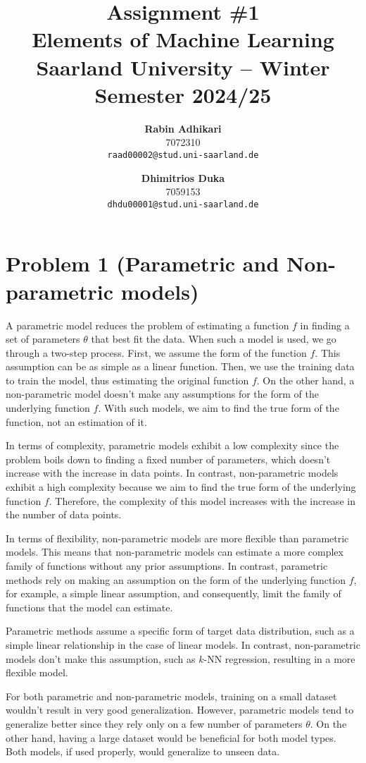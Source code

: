 \documentclass{article}
\title{Assignment \#1\\
  \vspace{2mm}
  \small{Elements of Machine Learning}
  \\
  \vspace{2mm}
  \small{Saarland University -- Winter Semester 2024/25}
}
\author{%
\textbf{Rabin Adhikari} \\
  7072310 \\
  \texttt{raad00002@stud.uni-saarland.de} \\
  \and
  \textbf{Dhimitrios Duka} \\
 7059153 \\
  \texttt{dhdu00001@stud.uni-saarland.de} \\
}
\begin{document}
\maketitle

\section*{Problem 1 (Parametric and Non-parametric models)}
A parametric model reduces the problem of estimating a function $f$ in finding a set of parameters $\theta$ that best fit the data. When such a model is used, we go through a two-step process. First, we assume the form of the function $f$. This assumption can be as simple as a linear function. Then, we use the training data to train the model, thus estimating the original function $f$. On the other hand, a non-parametric model doesn't make any assumptions for the form of the underlying function $f$. With such models, we aim to find the true form of the function, not an estimation of it. 

In terms of complexity, parametric models exhibit a low complexity since the problem boils down to finding a fixed number of parameters, which doesn't increase with the increase in data points. In contrast, non-parametric models exhibit a high complexity because we aim to find the true form of the underlying function $f$. Therefore, the complexity of this model increases with the increase in the number of data points.

In terms of flexibility, non-parametric models are more flexible than parametric models. This means that non-parametric models can estimate a more complex family of functions without any prior assumptions. In contrast, parametric methods rely on making an assumption on the form of the underlying function $f$, for example, a simple linear assumption, and consequently, limit the family of functions that the model can estimate.

Parametric methods assume a specific form of target data distribution, such as a simple linear relationship in the case of linear models. In contrast, non-parametric models don't make this assumption, such as $k$-NN regression, resulting in a more flexible model.

For both parametric and non-parametric models, training on a small dataset wouldn't result in very good generalization. However, parametric models tend to generalize better since they rely only on a few number of parameters $\theta$. On the other hand, having a large dataset would be beneficial for both model types. Both models, if used properly, would generalize to unseen data.

\clearpage

% 
% 

\end{document}
